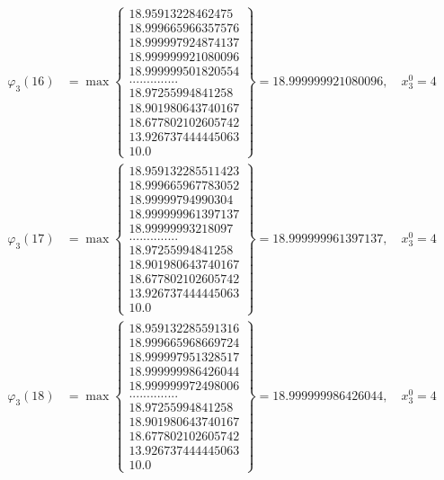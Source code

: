 \documentclass{article}
\begin{document}
\begin{align*}
  
  
  
\varphi_{3}(16) &= \max \left\{ \begin{array}{c}
18.95913228462475 \\
 18.999665966357576 \\
 18.999997924874137 \\
 18.999999921080096 \\
 18.999999501820554 \\
 .............. \\
 18.97255994841258 \\
 18.901980643740167 \\
 18.677802102605742 \\
 13.926737444445063 \\
 10.0
\end{array} \right\} = 18.999999921080096, \quad x_{3}^0 = 4\\
  
  
  
  
\varphi_{3}(17) &= \max \left\{ \begin{array}{c}
18.959132285511423 \\
 18.999665967783052 \\
 18.99999794990304 \\
 18.999999961397137 \\
 18.99999993218097 \\
 .............. \\
 18.97255994841258 \\
 18.901980643740167 \\
 18.677802102605742 \\
 13.926737444445063 \\
 10.0
\end{array} \right\} = 18.999999961397137, \quad x_{3}^0 = 4\\
  
  
  
  
\varphi_{3}(18) &= \max \left\{ \begin{array}{c}
18.959132285591316 \\
 18.999665968669724 \\
 18.999997951328517 \\
 18.999999986426044 \\
 18.999999972498006 \\
 .............. \\
 18.97255994841258 \\
 18.901980643740167 \\
 18.677802102605742 \\
 13.926737444445063 \\
 10.0
\end{array} \right\} = 18.999999986426044, \quad x_{3}^0 = 4\\
  

\end{align*}
\end{document}
